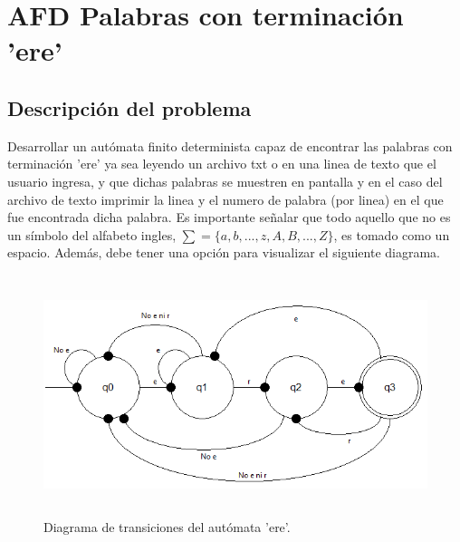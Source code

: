 \section{AFD Palabras con terminación 'ere'}
	\subsection{Descripción del problema}
	Desarrollar un autómata finito determinista capaz de encontrar las palabras con terminación 'ere' ya sea leyendo un archivo txt o en una linea de texto que el usuario ingresa, y que dichas palabras se muestren en pantalla y en el caso del archivo de texto imprimir la linea y el numero de palabra (por linea) en el que fue encontrada dicha palabra.
	Es importante señalar que todo aquello que no es un símbolo del alfabeto ingles, $ \sum =\lbrace a, b, ..., z, A, B, ..., Z \rbrace $, es tomado como un espacio. Además, debe tener una opción para visualizar el siguiente diagrama.
	\begin{figure}[H]
		\begin{center}
		\includegraphics[width=14cm, height=7cm]{img/ere.png}
		\caption{Diagrama de transiciones del autómata 'ere'.}
		\label{fig:diagrama1}
		\end{center}
	\end{figure}
